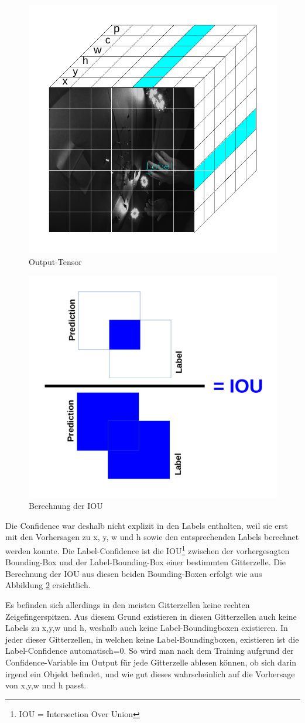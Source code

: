 \begin{figure}	
	\centering
	\includegraphics[width=.7\textwidth]{Kapitel/50Kostenfunktion/Bilder/PredictionTensor.pdf}
	\caption{Output-Tensor}
	\label{img:output_tensor}
\end{figure} 
\begin{figure}	
	\centering
	\includegraphics[width=.4\textwidth]{Kapitel/50Kostenfunktion/Bilder/IOU.pdf}
	\caption{Berechnung der IOU}
	\label{img:IOU}
\end{figure} 

Die Confidence war deshalb nicht explizit in den Labels enthalten, weil sie erst mit den Vorhersagen zu x, y, w und h sowie den entsprechenden Labels berechnet werden konnte.
Die Label-Confidence ist die IOU\footnote{\label{foot:1}IOU = Intersection Over Union} zwischen der vorhergesagten Bounding-Box und der Label-Bounding-Box einer bestimmten Gitterzelle. 
Die Berechnung der IOU aus diesen beiden Bounding-Boxen erfolgt wie aus Abbildung \ref{img:IOU} ersichtlich.

Es befinden sich allerdings in den meisten Gitterzellen keine rechten Zeigefingerspitzen. 
Aus diesem Grund existieren in diesen Gitterzellen auch keine Labels zu x,y,w und h, weshalb auch keine Label-Boundingboxen existieren.
In jeder dieser Gitterzellen, in welchen keine Label-Boundingboxen, existieren ist die Label-Confidence automatisch=0. 
So wird man nach dem Training aufgrund der Confidence-Variable im Output für jede Gitterzelle ablesen können, ob sich darin irgend ein Objekt befindet, und wie gut dieses wahrscheinlich auf die Vorhersage von x,y,w und h passt.





